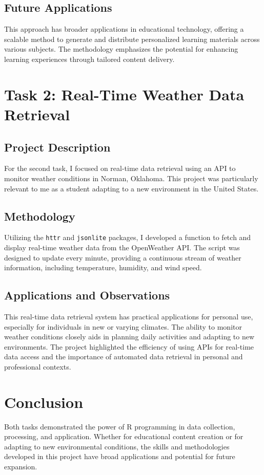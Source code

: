 \documentclass{article}
\begin{document}
\subsection{Future Applications}

This approach has broader applications in educational technology, offering a scalable method to generate and distribute personalized learning materials across various subjects. The methodology emphasizes the potential for enhancing learning experiences through tailored content delivery.

\section{Task 2: Real-Time Weather Data Retrieval}

\subsection{Project Description}

For the second task, I focused on real-time data retrieval using an API to monitor weather conditions in Norman, Oklahoma. This project was particularly relevant to me as a student adapting to a new environment in the United States.

\subsection{Methodology}

Utilizing the \texttt{httr} and \texttt{jsonlite} packages, I developed a function to fetch and display real-time weather data from the OpenWeather API. The script was designed to update every minute, providing a continuous stream of weather information, including temperature, humidity, and wind speed.

\subsection{Applications and Observations}

This real-time data retrieval system has practical applications for personal use, especially for individuals in new or varying climates. The ability to monitor weather conditions closely aids in planning daily activities and adapting to new environments. The project highlighted the efficiency of using APIs for real-time data access and the importance of automated data retrieval in personal and professional contexts.

\section{Conclusion}

Both tasks demonstrated the power of R programming in data collection, processing, and application. Whether for educational content creation or for adapting to new environmental conditions, the skills and methodologies developed in this project have broad applications and potential for future expansion.
\end{document}
